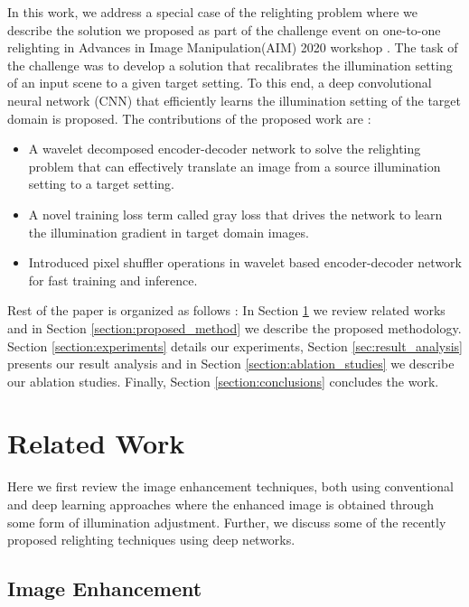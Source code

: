 \documentclass[runningheads]{llncs}
\begin{document}
 In this work, we address a special case of the relighting problem where we describe the solution we proposed as part of the challenge event on one-to-one relighting in Advances in Image Manipulation(AIM) 2020 workshop \cite{elhelou2020aim}. The task of the challenge was to develop a solution that recalibrates the illumination setting of an input scene to a given target setting. To this end, a deep convolutional neural network (CNN) that efficiently learns the illumination setting of the target domain is proposed.
 The contributions of the proposed work are :
\renewcommand{\labelitemi}{\textbullet}
\begin{itemize}
\item A wavelet decomposed encoder-decoder network to solve the relighting problem that can effectively translate an image from a source illumination setting to a target setting.
\item A novel training loss term called gray loss that drives the network to learn the illumination gradient in target domain images.
\item  Introduced pixel shuffler operations in wavelet based encoder-decoder network for fast training and inference.
\end{itemize}
Rest of the paper is organized as follows : In Section \ref{sec:related_wok} we review related works and in Section \ref{section:proposed_method} we describe the proposed methodology. Section \ref{section:experiments} details our experiments, Section \ref{sec:result_analysis} presents our result analysis and in Section \ref{section:ablation_studies} we describe our ablation studies. Finally, Section \ref{section:conclusions} concludes the work.


\section{Related Work}
\label{sec:related_wok}
Here we first review the image enhancement techniques, both using conventional and deep learning approaches where the enhanced image is obtained through some form of illumination adjustment. Further, we discuss some of the recently proposed relighting techniques using deep networks.
\subsection{Image Enhancement}
\end{document}

